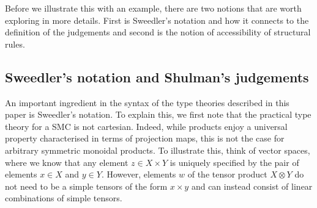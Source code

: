\documentclass[pra,floatfix,
amsmath,superscriptaddress, 12pt]{article}
\theoremstyle{definition}
\begin{document}

Before we illustrate this with an example, there are two notions that are worth exploring in more details. First is Sweedler's notation and how it connects to the definition of the judgements and second is the notion of accessibility of structural rules. 



\subsection{Sweedler's notation and Shulman's judgements}




An important ingredient in the syntax of the type theories described in this paper is Sweedler's notation. To explain this, we first note that the practical type theory for a SMC is not cartesian. Indeed, while products enjoy a universal property characterised in terms of projection maps, this is not the case for arbitrary symmetric monoidal products. To illustrate this, think of vector spaces, where we know that any element  $z\in X \times Y$ is uniquely specified by the pair of elements $x\in X$ and $y\in Y$. However, elements $w$ of the tensor product $X\otimes Y$ do not need to be a simple tensors of the form $x\times y$ and can instead consist of linear combinations of simple tensors. 
\end{document}

